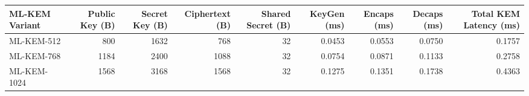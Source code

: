 \begin{tabular}{lrrrrrrrr}
\toprule
ML-KEM Variant & Public Key (B) & Secret Key (B) & Ciphertext (B) & Shared Secret (B) & KeyGen (ms) & Encaps (ms) & Decaps (ms) & Total KEM Latency (ms) \\
\midrule
ML-KEM-512 & 800 & 1632 & 768 & 32 & 0.0453 & 0.0553 & 0.0750 & 0.1757 \\
ML-KEM-768 & 1184 & 2400 & 1088 & 32 & 0.0754 & 0.0871 & 0.1133 & 0.2758 \\
ML-KEM-1024 & 1568 & 3168 & 1568 & 32 & 0.1275 & 0.1351 & 0.1738 & 0.4363 \\
\bottomrule
\end{tabular}
